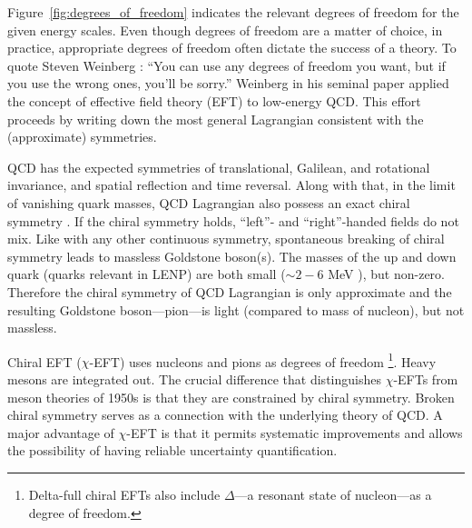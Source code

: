 	Figure~\ref{fig:degrees_of_freedom} indicates the relevant degrees of freedom
	for the given energy scales.  Even though degrees of freedom are a matter of
	choice, in practice, appropriate degrees of freedom often dictate the
	success of a theory.  To quote Steven Weinberg \cite{Guth:1984rq}:
	``You can use any degrees of freedom you want, but if you use the wrong ones,
	you'll be sorry.''
	Weinberg in his seminal paper \cite{Weinberg:1978kz} applied the concept
	of effective field theory (EFT) to low-energy QCD.  This effort
	proceeds by writing down the most general Lagrangian consistent with the
	(approximate) symmetries.

	QCD has the expected symmetries of translational, Galilean, and rotational
	invariance, and spatial reflection and time reversal.  Along with that,
	in the limit of vanishing quark masses, QCD Lagrangian also possess an exact
	chiral symmetry \cite{Peskin1995a}.  If the chiral symmetry holds,
	``left''- and
	``right''-handed fields do not mix.  Like with any other continuous symmetry,
	spontaneous breaking of chiral symmetry leads to massless Goldstone boson(s).
	The masses of the up and down quark (quarks relevant in LENP) are both small
	($\sim 2 - 6$ MeV \cite{Agashe:2014kda}), but non-zero.  Therefore the
	chiral symmetry of QCD Lagrangian is only approximate and the resulting
	Goldstone boson---pion---is light (compared to mass of nucleon), but not
	massless.

	Chiral EFT ($\chi$-EFT) uses nucleons and pions as degrees of freedom
	\footnote{Delta-full chiral EFTs also include
	$\Delta$---a resonant state of nucleon---as a degree of freedom. }.
	Heavy mesons are
	integrated out.  The crucial difference that distinguishes $\chi$-EFTs from
	meson theories of 1950s is that they are constrained by chiral symmetry.
	Broken chiral symmetry serves as a connection with the underlying theory of
	QCD.
	A major advantage of $\chi$-EFT is that it permits systematic improvements
	and allows the possibility of having reliable uncertainty quantification.


